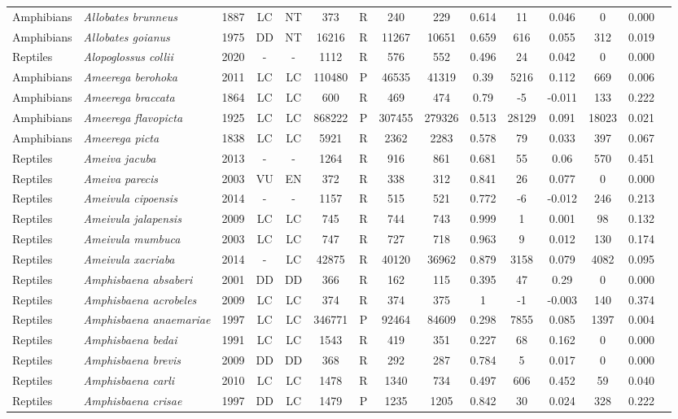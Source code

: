 \documentclass[12pt,openright,oneside,a4paper,english]{abntex2}
\begin{document}
\begin{landscape}
\begin{longtable}{llccccccccccccc}
		Amphibians&\textit{Allobates brunneus}&1887&LC&NT&373&R&240&229&0.614&11&0.046&0&0.000\\
		Amphibians&\textit{Allobates goianus}&1975&DD&NT&16216&R&11267&10651&0.659&616&0.055&312&0.019\\
		Reptiles&\textit{Alopoglossus collii}&2020&-&-&1112&R&576&552&0.496&24&0.042&0&0.000\\
		Amphibians&\textit{Ameerega berohoka}&2011&LC&LC&110480&P&46535&41319&0.39&5216&0.112&669&0.006\\
		Amphibians&\textit{Ameerega braccata}&1864&LC&LC&600&R&469&474&0.79&-5&-0.011&133&0.222\\
		Amphibians&\textit{Ameerega flavopicta}&1925&LC&LC&868222&P&307455&279326&0.513&28129&0.091&18023&0.021\\
		Amphibians&\textit{Ameerega picta}&1838&LC&LC&5921&R&2362&2283&0.578&79&0.033&397&0.067\\
		Reptiles&\textit{Ameiva jacuba}&2013&-&-&1264&R&916&861&0.681&55&0.06&570&0.451\\
		Reptiles&\textit{Ameiva parecis}&2003&VU&EN&372&R&338&312&0.841&26&0.077&0&0.000\\
		Reptiles&\textit{Ameivula cipoensis}&2014&-&-&1157&R&515&521&0.772&-6&-0.012&246&0.213\\
		Reptiles&\textit{Ameivula jalapensis}&2009&LC&LC&745&R&744&743&0.999&1&0.001&98&0.132\\
		Reptiles&\textit{Ameivula mumbuca}&2003&LC&LC&747&R&727&718&0.963&9&0.012&130&0.174\\
		Reptiles&\textit{Ameivula xacriaba}&2014&-&LC&42875&R&40120&36962&0.879&3158&0.079&4082&0.095\\
		Reptiles&\textit{Amphisbaena absaberi}&2001&DD&DD&366&R&162&115&0.395&47&0.29&0&0.000\\
		Reptiles&\textit{Amphisbaena acrobeles}&2009&LC&LC&374&R&374&375&1&-1&-0.003&140&0.374\\
		Reptiles&\textit{Amphisbaena anaemariae}&1997&LC&LC&346771&P&92464&84609&0.298&7855&0.085&1397&0.004\\
		Reptiles&\textit{Amphisbaena bedai}&1991&LC&LC&1543&R&419&351&0.227&68&0.162&0&0.000\\
		Reptiles&\textit{Amphisbaena brevis}&2009&DD&DD&368&R&292&287&0.784&5&0.017&0&0.000\\
		Reptiles&\textit{Amphisbaena carli}&2010&LC&LC&1478&R&1340&734&0.497&606&0.452&59&0.040\\
		Reptiles&\textit{Amphisbaena crisae}&1997&DD&LC&1479&P&1235&1205&0.842&30&0.024&328&0.222\\

\end{longtable}
\end{landscape}
\end{document}
